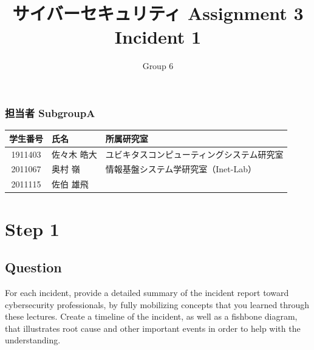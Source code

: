 \documentclass[uplatex]{jsarticle}
\title{
    \vspace{-1.5cm}
    サイバーセキュリティ Assignment 3 \\
    Incident 1
}
\author{Group 6}
\begin{document}
\maketitle

\subsubsection*{担当者 SubgroupA}
\begin{table}[H]
    \begin{tabular}{|c|l|l|}
        \hline
        学生番号 & 氏名 & 所属研究室\\
        \hline\hline
        1911403 & 佐々木 皓大 & ユビキタスコンピューティングシステム研究室\\
        \hline
        2011067 & 奥村 嶺 & 情報基盤システム学研究室（Inet-Lab）\\
        \hline
        2011115 & 佐伯 雄飛 & \\
        \hline
    \end{tabular}
\end{table}

\section*{Step 1}
\subsection*{Question}
For each incident, provide a detailed summary of the incident report toward cybersecurity professionals, by fully mobilizing concepts that you learned through these lectures. Create a timeline of the incident, as well as a fishbone diagram, that illustrates root cause and other important events in order to help with the understanding.
\end{document}
